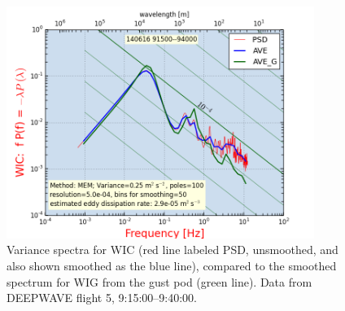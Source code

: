 \documentclass[12pt,twoside,english]{article}\usepackage[]{graphicx}\usepackage[]{color}
\let\OrgIndex\index
\renewcommand*{\index}[1]{\OrgIndex{#1}}
\begin{document}
% 
% 
% 

\begin{figure}
\noindent \begin{centering}
\includegraphics[width=10cm]{SpecialGraphics/GPrf11Fig5.png}  
\par\end{centering}

\protect\caption{\label{fig:VarSpecWICandWIG}Variance spectra for WIC (red line labeled PSD, unsmoothed, and also shown smoothed as the blue line), compared to the smoothed spectrum for WIG from the gust pod (green line). Data from DEEPWAVE flight 5, 9:15:00--9:40:00.} 
\end{figure}
\end{document}

